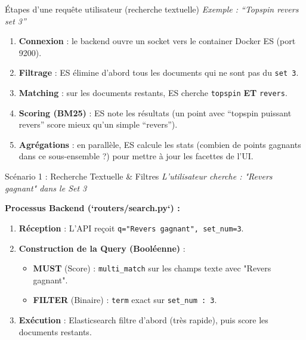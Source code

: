 \documentclass[aspectratio=169, 11pt]{beamer}
\begin{document}
\begin{frame}{Étapes d'une requête utilisateur (recherche textuelle)}
    \textit{Exemple : ``Topspin revers set 3''}
    
    \vspace{0.3cm}
    \begin{enumerate}
        \item \textbf{Connexion} : le backend ouvre un socket vers le container Docker ES (port 9200).
        \item \textbf{Filtrage} : ES élimine d'abord tous les documents qui ne sont pas du \texttt{set 3}.
        \item \textbf{Matching} : sur les documents restants, ES cherche \texttt{topspin} \textbf{ET} \texttt{revers}.
        \item \textbf{Scoring (BM25)} : ES note les résultats (un point avec ``topspin puissant revers'' score mieux qu’un simple ``revers'').
        \item \textbf{Agrégations} : en parallèle, ES calcule les stats (combien de points gagnants dans ce sous-ensemble ?) pour mettre à jour les facettes de l’UI.
    \end{enumerate}
\end{frame}

\begin{frame}{Scénario 1 : Recherche Textuelle \& Filtres}
    \textit{L'utilisateur cherche : "Revers gagnant" dans le Set 3}
    
    \textbf{Processus Backend (`routers/search.py`) :}
    
    \begin{enumerate}
        \item \textbf{Réception} : L'API reçoit \texttt{q="Revers gagnant", set\_num=3}.
        \item \textbf{Construction de la Query (Booléenne)} :
            \begin{itemize}
                \item \textbf{MUST} (Score) : \texttt{multi\_match} sur les champs texte avec "Revers gagnant".
                \item \textbf{FILTER} (Binaire) : \texttt{term} exact sur \texttt{set\_num : 3}.
            \end{itemize}
        \item \textbf{Exécution} : Elasticsearch filtre d'abord (très rapide), puis score les documents restants.
    \end{enumerate}
\end{frame}
\end{document}
